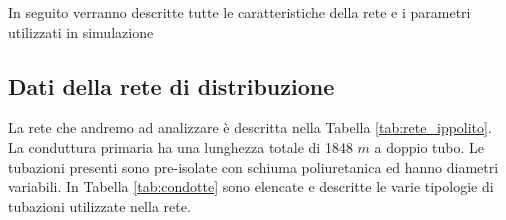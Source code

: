 \documentclass[laurea,oneside,11pt]{USiena_tesiLM3}
\begin{document}
In seguito verranno descritte tutte le caratteristiche della rete e i parametri utilizzati in simulazione

\subsection{Dati della rete di distribuzione}
La rete che andremo ad analizzare è descritta nella Tabella \ref{tab:rete_ippolito}. La conduttura primaria ha una lunghezza totale di 1848 $m$ a doppio tubo. Le tubazioni presenti sono pre-isolate con schiuma poliuretanica ed hanno diametri variabili. In Tabella \ref{tab:condotte} sono elencate e descritte le varie tipologie di tubazioni utilizzate nella rete.


\begin{table}[!ht]
\centering
{}
\end{table}
\end{document}
